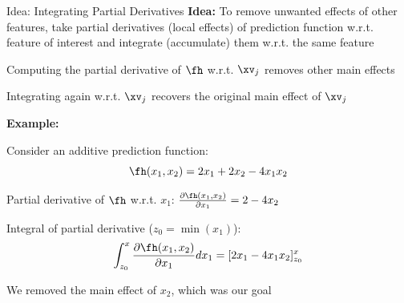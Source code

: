 \documentclass[10pt,compress,t,notes=noshow, xcolor=table]{beamer}
\begin{document}
\begin{framev}[align=top]{Idea: Integrating Partial Derivatives}
\textbf{Idea:} To remove unwanted effects of other features, take partial derivatives (local effects) of prediction function w.r.t. feature of interest and integrate (accumulate) them w.r.t. the same feature
\begin{itemizeM}
\item[$\Rightarrow$] Computing the partial derivative of $\fh$ w.r.t. $\xv_j$ removes other main effects
\item[$\Rightarrow$] Integrating again w.r.t. $\xv_j$ recovers the original main effect of $\xv_j$
\end{itemizeM}
\pause %
\textbf{Example:}
\begin{itemizeM}
\item<+-> Consider an additive prediction function:
$$
\fh(x_1, x_2) = 2x_1 + 2x_2 - 4x_1 x_2
$$
\item<+-> Partial derivative of $\fh$ w.r.t. $x_1$:
$\frac{\partial \fh(x_1, x_2)}{\partial x_1} = 2 - 4x_2$
\item<+-> Integral of partial derivative ($z_0 = \min(x_1)$):
$$
\int_{z_0}^{x} \frac{\partial \fh(x_1, x_2)}{\partial x_1} dx_1 = [2x_1 - 4x_1 x_2]_{z_0}^{x}
$$
\item<+-> We removed the main effect of $x_2$, which was our goal %
\end{itemizeM}
\end{framev}


\endlecture
\end{document}
